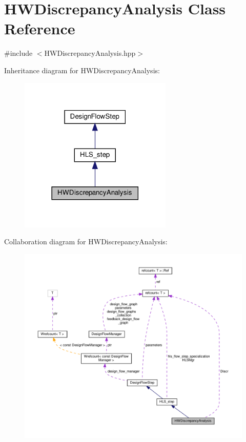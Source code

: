 \hypertarget{classHWDiscrepancyAnalysis}{}\section{H\+W\+Discrepancy\+Analysis Class Reference}
\label{classHWDiscrepancyAnalysis}


{\ttfamily \#include $<$H\+W\+Discrepancy\+Analysis.\+hpp$>$}



Inheritance diagram for H\+W\+Discrepancy\+Analysis\+:
\nopagebreak
\begin{figure}[H]
\begin{center}
\leavevmode
\includegraphics[width=206pt]{d8/d35/classHWDiscrepancyAnalysis__inherit__graph}
\end{center}
\end{figure}


Collaboration diagram for H\+W\+Discrepancy\+Analysis\+:
\nopagebreak
\begin{figure}[H]
\begin{center}
\leavevmode
\includegraphics[width=350pt]{d9/d34/classHWDiscrepancyAnalysis__coll__graph}
\end{center}
\end{figure}
